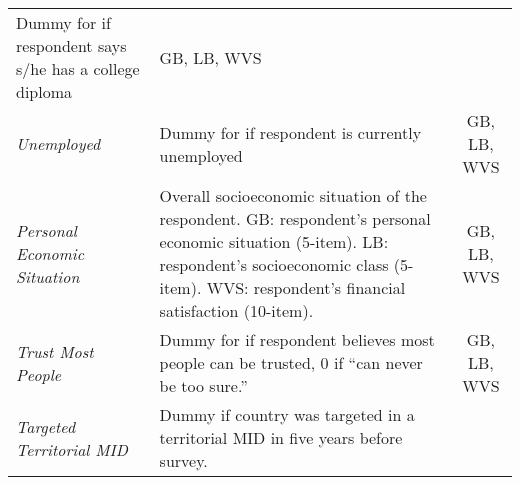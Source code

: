 \documentclass[11pt,]{article}
\begin{document}
\begin{longtable}[]{@{}llc@{}}
\begin{minipage}[t]{0.46\columnwidth}
Dummy for if respondent says s/he has a college diploma\strut
\end{minipage} & \begin{minipage}[t]{0.22\columnwidth}\centering\strut
GB, LB, WVS\strut
\end{minipage}\tabularnewline
\begin{minipage}[t]{0.19\columnwidth}\raggedright\strut
\emph{Unemployed}\strut
\end{minipage} & \begin{minipage}[t]{0.46\columnwidth}\raggedright\strut
Dummy for if respondent is currently unemployed\strut
\end{minipage} & \begin{minipage}[t]{0.22\columnwidth}\centering\strut
GB, LB, WVS\strut
\end{minipage}\tabularnewline
\begin{minipage}[t]{0.19\columnwidth}\raggedright\strut
\emph{Personal Economic Situation}\strut
\end{minipage} & \begin{minipage}[t]{0.46\columnwidth}\raggedright\strut
Overall socioeconomic situation of the respondent. GB: respondent's
personal economic situation (5-item). LB: respondent's socioeconomic
class (5-item). WVS: respondent's financial satisfaction
(10-item).\strut
\end{minipage} & \begin{minipage}[t]{0.22\columnwidth}\centering\strut
GB, LB, WVS\strut
\end{minipage}\tabularnewline
\begin{minipage}[t]{0.19\columnwidth}\raggedright\strut
\emph{Trust Most People}\strut
\end{minipage} & \begin{minipage}[t]{0.46\columnwidth}\raggedright\strut
Dummy for if respondent believes most people can be trusted, 0 if ``can
never be too sure.''\strut
\end{minipage} & \begin{minipage}[t]{0.22\columnwidth}\centering\strut
GB, LB, WVS\strut
\end{minipage}\tabularnewline
\begin{minipage}[t]{0.19\columnwidth}\raggedright\strut
\emph{Targeted Territorial MID}\strut
\end{minipage} & \begin{minipage}[t]{0.46\columnwidth}\raggedright\strut
Dummy if country was targeted in a territorial MID in five years before
survey.\strut
\end{minipage} & \begin{minipage}[t]{0.22\columnwidth}\centering\strut

\end{minipage}
\end{longtable}
\end{document}
